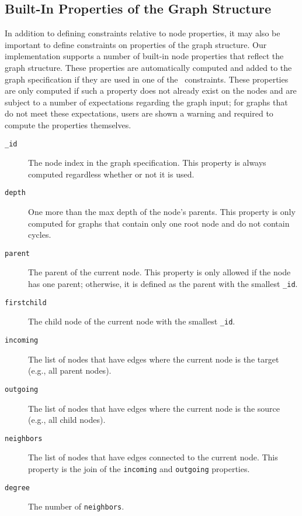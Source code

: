 \subsection{Built-In Properties of the Graph Structure}

In addition to defining constraints relative to node properties, it may
also be important to define constraints on properties
of the graph structure. Our implementation supports a 
number of built-in node properties that reflect the graph structure.
These properties are automatically computed and added to the graph 
specification if they are used in one of the \projectname\ constraints. 
These properties are only computed if such a property does not
already exist on the nodes and are subject to a number of expectations
regarding the graph input; for graphs that do not meet these expectations,
users are shown a warning and required to compute the properties
themselves.


\begin{description}
\item[\texttt{\_id}] The node index in the graph specification. This
  property is always computed regardless whether or not it is used.
\item[\texttt{depth}] One more than the max depth of the node's
  parents. This property is only computed for graphs that contain only one
  root node and do not contain cycles. 
\item[\texttt{parent}] The parent of the current node. This property is
  only allowed if the node has one parent; otherwise, it is defined as the
  parent with the smallest \texttt{\_id}.
\item[\texttt{firstchild}] The child node of the current node with the smallest \texttt{\_id}.
\item[\texttt{incoming}] The list of nodes that have edges where the
  current node is the target (e.g., all parent nodes).
\item[\texttt{outgoing}] The list of nodes that have edges where the
  current node is the source (e.g., all child nodes).
\item[\texttt{neighbors}] The list of nodes that have edges connected to
  the current node. This property is the join of the \texttt{incoming} and
  \texttt{outgoing} properties.
\item[\texttt{degree}] The number of \texttt{neighbors}.
\end{description}

